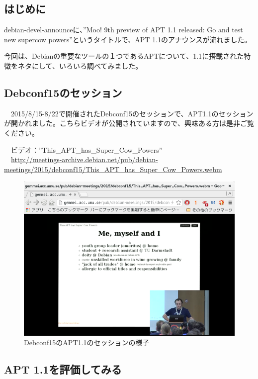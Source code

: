 \documentclass[mingoth,a4paper]{jsarticle}
\begin{document}


\subsection{はじめに}

 debian-devel-announceに、''Moo! 9th preview of APT 1.1 released: Go and test new supercow powers''というタイトルで、APT 1.1のアナウンスが流れました。

 今回は、Debianの重要なツールの１つであるAPTについて、1.1に搭載された特徴をネタにして、いろいろ調べてみました。

\subsection{Debconf15のセッション}

　2015/8/15-8/22で開催されたDebconf15のセッションで、APT1.1のセッションが開かれました。こちらビデオが公開されていますので、興味ある方は是非ご覧ください。

　ビデオ：''This\_APT\_has\_Super\_Cow\_Powers''\\
　\url{http://meetings-archive.debian.net/pub/debian-meetings/2015/debconf15/This_APT_has_Super_Cow_Powers.webm}

\begin{figure}[H]
\begin{center}
 \includegraphics[width=0.5\hsize]{image201508/debconf15-apt.png}
\end{center}
\caption{Debconf15のAPT1.1のセッションの様子}
\end{figure}

\subsection{APT 1.1を評価してみる}
\end{document}
